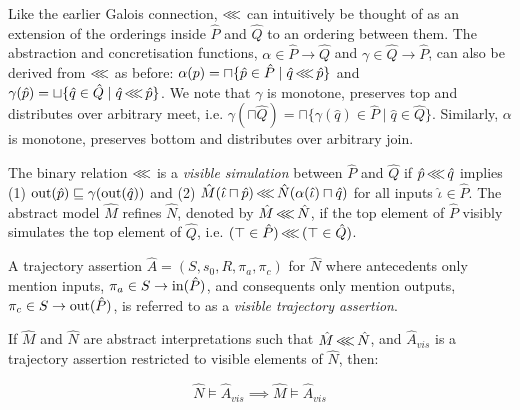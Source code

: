 \noindent Like the earlier Galois connection, $\operatorname{\lll}$ can intuitively be thought of as an extension of the orderings inside $\hat P$ and $\hat Q$ to an ordering between them. The abstraction and concretisation functions, $\alpha \in \hat P \rightarrow \hat Q$ and $\gamma \in \hat Q \rightarrow \hat P$, can also be derived from $\operatorname{\lll}$ as before: $\alpha(p) = \sqcap \{ \hat p \in \hat P \mid \hat q \operatorname{\lll} \hat p \}$ and $\gamma(\hat p) = \sqcup \{ \hat q \in \hat Q \mid \hat q \operatorname{\lll} \hat p \}$. We note that $\gamma$ is monotone, preserves top and distributes over arbitrary meet, i.e. $\gamma(\sqcap \hat Q) = \sqcap \{ \gamma(\hat q) \in \hat P \mid \hat q \in \hat Q\}$. Similarly, $\alpha$ is monotone, preserves bottom and distributes over arbitrary join.

The binary relation $\operatorname{\lll}$ is a \textit{visible simulation} between $\hat P$ and $\hat Q$ if $\hat p \operatorname{\lll} \hat q$ implies (1) $\operatorname{out}(\hat p) \sqsubseteq \gamma(\operatorname{out}(\hat q))$ and (2) $\hat M(\hat \iota \sqcap \hat p) \operatorname{\lll} \hat N(\alpha(\hat \iota) \sqcap \hat q)$ for all inputs $\hat \iota \in \hat P$. The abstract model $\hat M$ refines $\hat N$, denoted by $\hat M \operatorname{\lll} \hat N$, if the top element of $\hat P$ visibly simulates the top element of $\hat Q$, i.e. $(\top \in \hat P) \operatorname{\lll} \, (\top \in \hat Q)$.

A trajectory assertion $\hat A = (S,s_{0},R,\pi_{a},\pi_{c})$ for $\hat N$ where antecedents only mention inputs, $\pi_{a} \in S \rightarrow \operatorname{in}(\hat P)$, and consequents only mention outputs, $\pi_{c} \in S \rightarrow \operatorname{out}(\hat P)$, is referred to as a \textit{visible trajectory assertion}.



\begin{theorem}
If $\hat M$ and $\hat N$ are abstract interpretations such that $\hat M \operatorname{\lll} \hat N$, and $\hat A_{vis}$ is a trajectory assertion restricted to visible elements of $\hat N$, then:

\begin{equation*}
\hat N \models \hat A_{vis} \implies \hat M \models \hat A_{vis}
\end{equation*}
\end{theorem}




